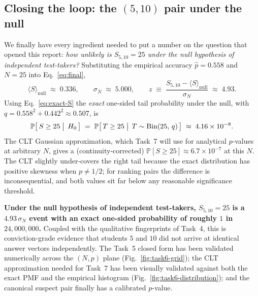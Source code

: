 \documentclass[11pt,a4paper]{article}
\renewcommand{\Pr}{\mathbb{P}}
\begin{document}
\subsection{Closing the loop: the $(5, 10)$ pair under the null}
We finally have every ingredient needed to put a number on the
question that opened this report: \emph{how unlikely is
$S_{5,10}=25$ under the null hypothesis of independent test-takers?}
Substituting the empirical accuracy $\hat p = 0.558$ and $N = 25$ into
Eq.~\eqref{eq:final},
\begin{equation}
  \langle S\rangle_{\text{null}} \;\approx\; 0.336,
  \qquad
  \sigma_N \;\approx\; 5.000,
  \qquad
  z \;\equiv\;
     \frac{S_{5,10}-\langle S\rangle_{\text{null}}}{\sigma_N}
     \;\approx\; 4.93.
  \label{eq:510z}
\end{equation}
Using Eq.~\eqref{eq:exact-S} the \emph{exact} one-sided tail probability
under the null, with $q = 0.558^{2} + 0.442^{2} \approx 0.507$, is
\begin{equation}
  \Pr\bigl[\,S \geq 25 \bigm|\, H_{0}\,\bigr]
  \;=\; \Pr\bigl[\,T \geq 25 \bigm|\, T \sim \mathrm{Bin}(25,\,q)\,\bigr]
  \;\approx\; 4.16\times 10^{-8}.
  \label{eq:510-exact-p}
\end{equation}
The CLT Gaussian approximation, which Task~7 will use for analytical
$p$-values at arbitrary $N$, gives a (continuity-corrected)
$\Pr[S \geq 25] \approx 6.7 \times 10^{-7}$ at this $N$.  The CLT
slightly under-covers the right tail because the exact distribution has
positive skewness when $p \neq 1/2$; for ranking pairs the difference is
inconsequential, and both values sit far below any reasonable
significance threshold.

\begin{keyresult}
\textbf{Under the null hypothesis of independent test-takers,
$S_{5,10}=25$ is a $4.93\,\sigma_N$ event with an exact one-sided
probability of roughly $1$ in $24{,}000{,}000$.} Coupled with the
qualitative fingerprints of Task~4, this is conviction-grade evidence
that students $5$ and $10$ did not arrive at identical answer vectors
independently. The Task~5 closed form has been validated numerically
across the $(N,p)$ plane (Fig.~\ref{fig:task6-grid}); the CLT
approximation needed for Task~7 has been visually validated against
both the exact PMF and the empirical histogram
(Fig.~\ref{fig:task6-distribution}); and the canonical suspect pair
finally has a calibrated $p$-value.
\end{keyresult}
\end{document}
